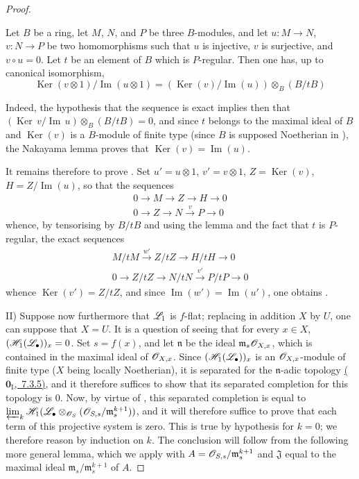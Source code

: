 \begin{proof}
\begin{lemma}[12.3.3.3]
\label{IV.12.3.3.3}
Let $B$ be a ring, let $M$, $N$, and $P$ be three $B$-modules, and let
$u:M\to N$, $v:N\to P$ be two homomorphisms such that $u$ is injective, $v$ is surjective, and $v\circ u=0$.
Let $t$ be an element of $B$ which is $P$-regular.
Then one has, up to canonical isomorphism,
\begin{equation}
\tag{12.3.3.4}
\label{IV.12.3.3.4}
\operatorname{Ker}(v\otimes 1)/\operatorname{Im}(u\otimes 1) = (\operatorname{Ker}(v)/\operatorname{Im}(u))\otimes_B(B/tB)
\end{equation}
\end{lemma}

Indeed, the hypothesis that the sequence  is exact implies then that $(\operatorname{Ker}\,v/\operatorname{Im}\,u)\otimes_B(B/tB)=0$, and since $t$ belongs to the maximal ideal of $B$ and $\operatorname{Ker}(v)$ is a $B$-module of finite type (since $B$ is supposed Noetherian in ), the Nakayama lemma proves that $\operatorname{Ker}(v)=\operatorname{Im}(u)$.

It remains therefore to prove .
Set $u'=u\otimes 1$, $v'=v\otimes 1$, $Z=\operatorname{Ker}(v)$, $H=Z/\operatorname{Im}(u)$, so that the sequences
\begin{gather*}
  0\to M\to Z\to H\to 0\\
  0\to Z\to N\xrightarrow{v} P\to 0
\end{gather*}
whence, by tensorising by $B/tB$ and using the lemma  and the fact that $t$ is $P$-regular, the exact sequences
\begin{gather*}
  M/tM \xrightarrow{w'} Z/tZ \to H/tH \to 0\\
  0\to Z/tZ \to N/tN \xrightarrow{v'} P/tP \to 0
\end{gather*}
whence $\operatorname{Ker}(v')=Z/tZ$, and since $\operatorname{Im}(w')=\operatorname{Im}(u')$, one obtains .

\medskip
II) Suppose now furthermore that $\mathscr{L}_1$ is $f$-flat; replacing in addition $X$ by $U$, one can suppose that $X=U$.
It is a question of seeing that for every $x\in X$, $(\mathscr{H}_1(\mathscr{L}_\bullet))_x=0$.
Set $s=f(x)$, and let $\mathfrak{n}$ be the ideal $\mathfrak{m}_s\mathscr{O}_{X,x}$, which is contained in the maximal ideal of $\mathscr{O}_{X,x}$.
Since $(\mathscr{H}_1(\mathscr{L}_\bullet))_x$ is an $\mathscr{O}_{X,x}$-module of finite type ($X$ being locally Noetherian), it is separated for the $\mathfrak{n}$-adic topology \hyperref[0.7.3.5]{($\mathbf{0}_{\mathrm{I}}$,~7.3.5)}, and it therefore suffices to show that its separated completion for this topology is $0$.
Now, by virtue of , this separated completion is equal to
$\varprojlim_k\mathscr{H}_1(\mathscr{L}_\bullet\otimes_{\mathscr{O}_S}(\mathscr{O}_{S,s}/\mathfrak{m}_s^{k+1}))$, and it will therefore suffice to prove that each term of this projective system is zero.
This is true by hypothesis for $k=0$; we therefore reason by induction on $k$.
The conclusion will follow from the following more general lemma, which we apply with $A=\mathscr{O}_{S,s}/\mathfrak{m}_s^{k+1}$ and $\mathfrak{J}$ equal to the maximal ideal $\mathfrak{m}_s/\mathfrak{m}_s^{k+1}$ of $A$.


\end{proof}
